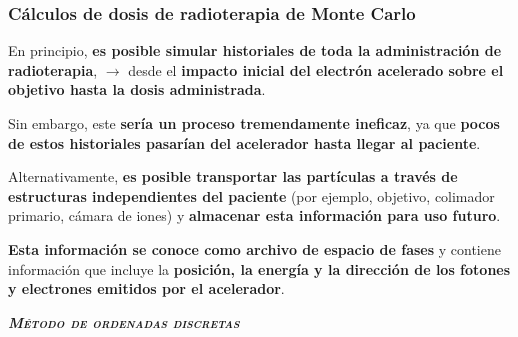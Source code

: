 \documentclass[aspectratio=169,xcolor=dvipsnames,t]{beamer}
\begin{document}
\begin{frame}

    \frametitle{Cálculos de dosis de radioterapia de Monte Carlo}

    En principio, \textbf{es posible simular historiales de toda la administración de radioterapia}, $\rightarrow$ desde el \textbf{impacto inicial del electrón acelerado sobre el objetivo hasta la dosis administrada}. 
    
    Sin embargo, este \textbf{sería un proceso tremendamente ineficaz}, ya que \textbf{pocos de estos historiales pasarían del acelerador hasta llegar al paciente}. 

    Alternativamente, \textbf{es posible transportar las partículas a través de estructuras independientes del paciente} (por ejemplo, objetivo, colimador primario, cámara de iones) y \textbf{almacenar esta información para uso futuro}. 

    \textbf{Esta información se conoce como archivo de espacio de fases} y contiene información que incluye la \textbf{posición, la energía y la dirección de los fotones y electrones emitidos por el acelerador}.

\end{frame}



\begin{frame}[standout]
    \centering\LARGE
    \textbf{\itshape\scshape Método de ordenadas discretas}
\end{frame}


\End
\begin{frame}[standout,bg=white.png]
      \centering
      \printbibliography
\end{frame}
\end{document}
